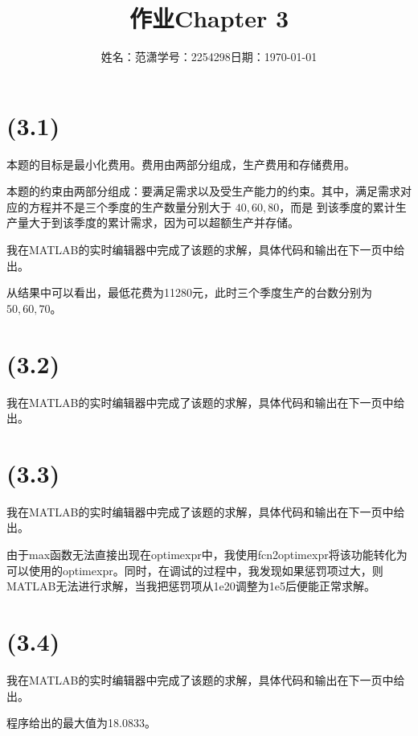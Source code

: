 \documentclass[a4paper]{article}
\title{作业{\hspace{1ex}}Chapter 3}
\author{姓名：范潇{\quad}学号：2254298{\quad}日期：\today}
\date{}
\begin{document}
\maketitle
\section{(3.1)}
本题的目标是最小化费用。费用由两部分组成，生产费用和存储费用。

本题的约束由两部分组成：要满足需求以及受生产能力的约束。其中，满足需求对应的方程并不是三个季度的生产数量分别大于 $40,60,80$，而是
到该季度的累计生产量大于到该季度的累计需求，因为可以超额生产并存储。

我在MATLAB的实时编辑器中完成了该题的求解，具体代码和输出在下一页中给出。

从结果中可以看出，最低花费为11280元，此时三个季度生产的台数分别为 $50,60,70$。
\newpage 
\section{(3.2)}
我在MATLAB的实时编辑器中完成了该题的求解，具体代码和输出在下一页中给出。
\newpage
\section{(3.3)}
我在MATLAB的实时编辑器中完成了该题的求解，具体代码和输出在下一页中给出。

由于max函数无法直接出现在optimexpr中，我使用fcn2optimexpr将该功能转化为可以使用的optimexpr。同时，在调试的过程中，我发现如果惩罚项过大，则
MATLAB无法进行求解，当我把惩罚项从1e20调整为1e5后便能正常求解。
\newpage 
\section{(3.4)}
我在MATLAB的实时编辑器中完成了该题的求解，具体代码和输出在下一页中给出。

程序给出的最大值为18.0833。
\newpage
\end{document}
